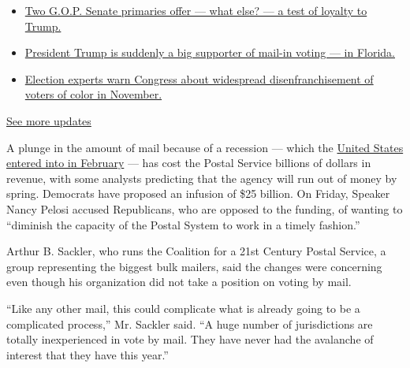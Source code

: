 \begin{itemize}
\tightlist
\item
  \href{https://www.nytimes3xbfgragh.onion/2020/08/04/us/elections/primary-election-michigan-arizona-kansas.html?action=click\&pgtype=Article\&state=default\&region=MAIN_CONTENT_1\&context=storylines_live_updates\#link-3924dd44}{Two
  G.O.P. Senate primaries offer --- what else? --- a test of loyalty to
  Trump.}
\item
  \href{https://www.nytimes3xbfgragh.onion/2020/08/04/us/elections/primary-election-michigan-arizona-kansas.html?action=click\&pgtype=Article\&state=default\&region=MAIN_CONTENT_1\&context=storylines_live_updates\#link-32b39e33}{President
  Trump is suddenly a big supporter of mail-in voting --- in Florida.}
\item
  \href{https://www.nytimes3xbfgragh.onion/2020/08/04/us/elections/primary-election-michigan-arizona-kansas.html?action=click\&pgtype=Article\&state=default\&region=MAIN_CONTENT_1\&context=storylines_live_updates\#link-6d019753}{Election
  experts warn Congress about widespread disenfranchisement of voters of
  color in November.}
\end{itemize}

\href{https://www.nytimes3xbfgragh.onion/2020/08/04/us/elections/primary-election-michigan-arizona-kansas.html?action=click\&pgtype=Article\&state=default\&region=MAIN_CONTENT_1\&context=storylines_live_updates}{See
more updates}

A plunge in the amount of mail because of a recession --- which the
\href{https://www.nytimes3xbfgragh.onion/2020/06/08/business/economy/us-economy-recession-2020.html}{United
States entered into in February} --- has cost the Postal Service
billions of dollars in revenue, with some analysts predicting that the
agency will run out of money by spring. Democrats have proposed an
infusion of \$25 billion. On Friday, Speaker Nancy Pelosi accused
Republicans, who are opposed to the funding, of wanting to ``diminish
the capacity of the Postal System to work in a timely fashion.''

Arthur B. Sackler, who runs the Coalition for a 21st Century Postal
Service, a group representing the biggest bulk mailers, said the changes
were concerning even though his organization did not take a position on
voting by mail.

``Like any other mail, this could complicate what is already going to be
a complicated process,'' Mr. Sackler said. ``A huge number of
jurisdictions are totally inexperienced in vote by mail. They have never
had the avalanche of interest that they have this year.''

